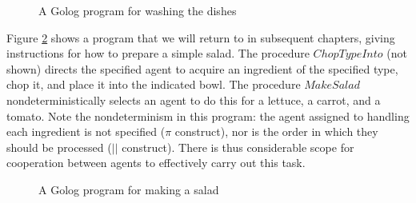 %
\begin{figure}
\begin{centering}
\par\end{centering}

\caption{A Golog program for washing the dishes\label{fig:Background:Golog:Washing-Dishes}}

\end{figure}


Figure \ref{fig:Background:Golog:MakeSalad} shows a program that
we will return to in subsequent chapters, giving instructions for
how to prepare a simple salad. The procedure $ChopTypeInto$ (not
shown) directs the specified agent to acquire an ingredient of the
specified type, chop it, and place it into the indicated bowl. The
procedure $MakeSalad$ nondeterministically selects an agent to do
this for a lettuce, a carrot, and a tomato. Note the nondeterminism
in this program: the agent assigned to handling each ingredient is
not specified ($\pi$ construct), nor is the order in which they should
be processed ($||$ construct). There is thus considerable scope for
cooperation between agents to effectively carry out this task.

%
\begin{figure}
\begin{centering}
\par\end{centering}

\caption{A Golog program for making a salad\label{fig:Background:Golog:MakeSalad}}

\end{figure}



